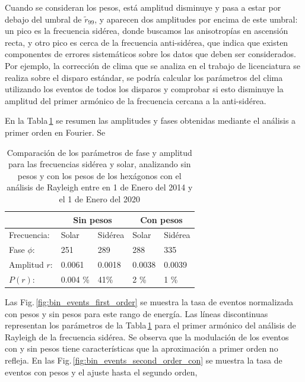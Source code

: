 Cuando se consideran los pesos, está amplitud disminuye y pasa a estar por debajo del umbral de $\tilde{r}_{99}$, y aparecen dos amplitudes por encima de este umbral: un pico es la frecuencia sidérea, donde buscamos las anisotropías en ascensión recta, y otro pico es cerca de la frecuencia anti-sidérea, que indica que existen componentes de errores sistemáticos sobre los datos que deben ser considerados. Por ejemplo, la corrección de clima que se analiza en el trabajo de licenciatura se realiza sobre el disparo estándar, se podría calcular los parámetros del clima utilizando los eventos de todos los disparos y comprobar si esto disminuye la amplitud del primer armónico de la frecuencia cercana a la anti-sidérea.

		
En la Tabla\,\ref{table:parametros_rayleigh} se resumen las amplitudes y fases obtenidas mediante el análisis a primer orden en Fourier. Se
		\begin{table}[H]
		\centering
		\begin{tabular}{|l|l|l|l|l|}
			\cline{2-5}
			\multicolumn{1}{c|}{} & \multicolumn{2}{c|}{Sin pesos} & \multicolumn{2}{c|}{Con pesos} \\ \hline
			Frecuencia:           & Solar          & Sidérea       & Solar         & Sidérea        \\ \hline
			Fase $\phi$:          & 251            & 289           & 288           & 335            \\ \hline
			Amplitud $r$:         & 0.0061         & 0.0018        & 0.0038        & 0.0039         \\ \hline
			$P(r)$:               & 0.004 \%       & 41\%          & 2 \%          & 1 \%       \\ \hline    
		\end{tabular}
		\caption{Comparación de los parámetros de fase y amplitud para las frecuencias sidérea y solar, analizando sin pesos y con los pesos de los hexágonos con el análisis de Rayleigh entre en 1 de Enero del 2014 y el 1 de Enero del 2020}
		\label{table:parametros_rayleigh}
		\end{table}


Las Fig.\,\ref{fig:bin_events_first_order} se muestra la tasa de eventos normalizada con pesos y sin pesos para este rango de energía. Las líneas discontinuas representan los parámetros de la Tabla\,\ref{table:parametros_rayleigh} para el primer armónico del análisis de Rayleigh de la frecuencia sidérea. Se observa que la modulación de los eventos con y sin pesos tiene características que la aproximación a primer orden no refleja. 	En las Fig.\,\ref{fig:bin_events_second_order_con} se muestra la tasa de eventos con pesos y el ajuste hasta el segundo orden, 

